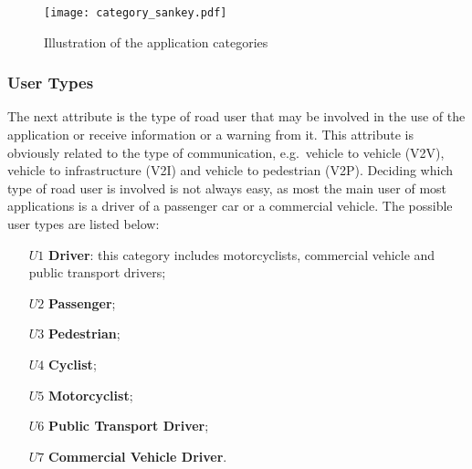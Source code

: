 \begin{figure}[ht!]
  \begin{center}
    \texttt{[image: category\_sankey.pdf]}
    \caption{Illustration of the application categories}
    \label{fig:app-category}
  \end{center}
\end{figure}

\subsubsection{User Types}
The next attribute is the type of road user that may be involved in the use of the application or receive information or a warning from it. This attribute is obviously related to the type of communication, e.g.\ vehicle to vehicle (V2V), vehicle to infrastructure (V2I) and vehicle to pedestrian (V2P). Deciding which type of road user is involved is not always easy, as most the main user of most applications is a driver of a passenger car or a commercial vehicle. The possible user types are listed below:


\begin{enumerate}
\item[$U1$] \textbf{Driver}: this category includes motorcyclists, commercial vehicle and public transport drivers; 
\item[$U2$] \textbf{Passenger};
\item[$U3$] \textbf{Pedestrian};
\item[$U4$] \textbf{Cyclist};
\item[$U5$] \textbf{Motorcyclist};
\item[$U6$] \textbf{Public Transport Driver};
\item[$U7$] \textbf{Commercial Vehicle Driver}.
\end{enumerate}

